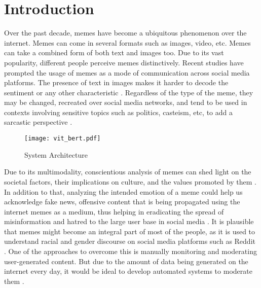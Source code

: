\documentclass[11pt,a4paper]{article}
\begin{document}
\section{Introduction} 
Over the past decade, memes have become a ubiquitous phenomenon over the internet. Memes can come in several formats such as images, video, etc. Memes can take a combined form of both text and images too. Due to its vast popularity, different people perceive memes distinctively. Recent studies have prompted the usage of memes as a mode of communication across social media platforms. The presence of text in images makes it harder to decode the sentiment or any other characteristic \cite{avvaru-vobilisetty-2020-bert}. Regardless of the type of the meme, they may be changed, recreated over social media networks, and tend to be used in contexts involving sensitive topics such as politics, casteism, etc, to add a sarcastic perspective \cite{8354676,Nave2018TalkingIP}.
\begin{figure*}[!h]
\centering
\texttt{[image: vit\_bert.pdf]}
\caption{System Architecture \cite{dosovitskiy2021an,devlin-etal-2019-bert}} \label{fig1}
\end{figure*}
Due to its multimodality, conscientious analysis of memes can shed light on the societal factors, their implications on culture, and the values promoted by them \cite{Milner2013FCJ156HT}. In addition to that, analyzing the intended emotion of a meme could help us acknowledge fake news, offensive content that is being propagated using the internet memes as a medium, thus helping in eradicating the spread of misinformation and hatred to the large user base in social media \cite{chakravarthi-etal-2020-corpus,chakravarthi-etal-2020-sentiment}. It is plausible that memes might become an integral part of most of the people, as it is used to understand racial and gender discourse on social media platforms such as Reddit \cite{Milner2013FCJ156HT,nikhilhope,nikhiloffen}. One of the approaches to overcome this is manually monitoring and moderating user-generated content. But due to the amount of data being generated on the internet every day, it would be ideal to develop automated systems to moderate them \cite{kumar-etal-2018-benchmarking,adeepoffensive,adeephope,10.1145/3441501.3441515,10.1145/3441501.3441517}.
\end{document}
